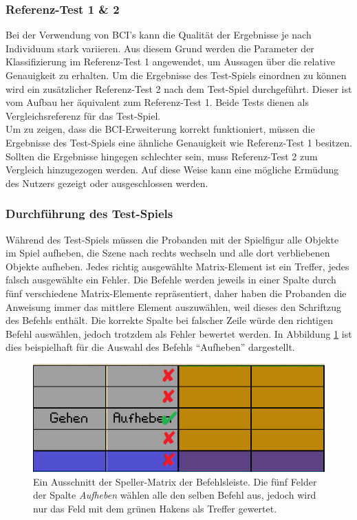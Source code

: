 \subsubsection{Referenz-Test 1 \& 2}
Bei der Verwendung von \acs{BCI}'s kann die Qualität der Ergebnisse je nach Individuum stark variieren.
Aus diesem Grund werden die Parameter der Klassifizierung im Referenz-Test 1 angewendet, um Aussagen über die relative Genauigkeit zu erhalten.
Um die Ergebnisse des Test-Spiels einordnen zu können wird ein zusätzlicher Referenz-Test 2 nach dem Test-Spiel durchgeführt.
Dieser ist vom Aufbau her äquivalent zum Referenz-Test 1.
Beide Tests dienen als Vergleichsreferenz für das Test-Spiel.\\

Um zu zeigen, dass die BCI-Erweiterung korrekt funktioniert, müssen die Ergebnisse des Test-Spiels eine ähnliche Genauigkeit wie Referenz-Test 1 besitzen.
Sollten die Ergebnisse hingegen schlechter sein, muss Referenz-Test 2 zum Vergleich hinzugezogen werden.
Auf diese Weise kann eine mögliche Ermüdung des Nutzers gezeigt oder ausgeschlossen werden.\\



\subsubsection{Durchführung des Test-Spiels}

Während des Test-Spiels müssen die Probanden mit der Spielfigur alle Objekte im Spiel aufheben, die Szene nach rechts wechseln und alle dort verbliebenen Objekte aufheben.
Jedes richtig ausgewählte Matrix-Element ist ein Treffer, jedes falsch ausgewählte ein Fehler. 
Die Befehle werden jeweils in einer Spalte durch fünf verschiedene Matrix-Elemente repräsentiert, daher haben die Probanden die Anweisung immer das mittlere Element auszuwählen, 
weil dieses den Schriftzug des Befehls enthält.
Die korrekte Spalte bei falscher Zeile würde den richtigen Befehl auswählen, jedoch trotzdem als Fehler bewertet werden.
In Abbildung \ref{befehlsmatrix} ist dies beispielhaft für die Auswahl des Befehls "`Aufheben"' dargestellt.\\

\pagebreak

\begin{figure}[h!]
\begin{center}
\includegraphics[scale=0.65]{images/BefehlsauswahlHitMiss.png}
\caption{Ein Ausschnitt der Speller-Matrix der Befehlsleiste. Die fünf Felder der Spalte \textit{Aufheben} wählen alle den selben Befehl aus, jedoch wird nur das Feld mit dem grünen Hakens als Treffer gewertet.}
\label{befehlsmatrix}
\end{center}
\end{figure}


